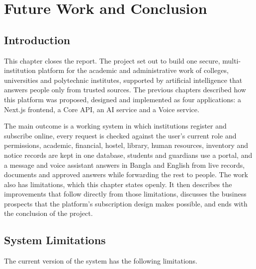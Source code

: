 \chapter{Future Work and Conclusion}
\label{ch:future-conclusion}

\section{Introduction}
This chapter closes the report. The project set out to build one secure, multi-institution platform for the academic and administrative work of colleges, universities and polytechnic institutes, supported by artificial intelligence that answers people only from trusted sources. The previous chapters described how this platform was proposed, designed and implemented as four applications: a Next.js frontend, a Core API, an AI service and a Voice service.

The main outcome is a working system in which institutions register and subscribe online, every request is checked against the user's current role and permissions, academic, financial, hostel, library, human resources, inventory and notice records are kept in one database, students and guardians use a portal, and a message and voice assistant answers in Bangla and English from live records, documents and approved answers while forwarding the rest to people. The work also has limitations, which this chapter states openly. It then describes the improvements that follow directly from those limitations, discusses the business prospects that the platform's subscription design makes possible, and ends with the conclusion of the project.

\section{System Limitations}
The current version of the system has the following limitations.

